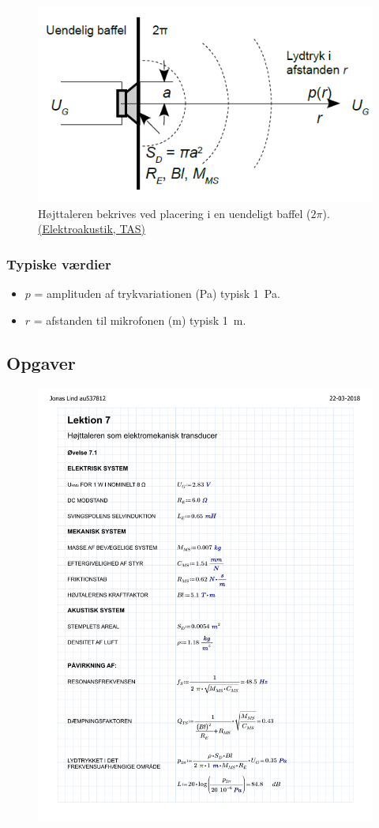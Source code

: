 \begin{figure} [H]
	\centering
	\includegraphics[width=0.7\linewidth]{graphics/29.png}
	\caption{Højttaleren bekrives ved placering i en uendeligt baffel ($2\pi$). \href{http://www.torean.dk/artikel/Elektroakustik.pdf}{(Elektroakustik, TAS)}}
	\label{fig:29}
\end{figure}

\subsubsection{Typiske værdier}
\begin{itemize}
	\item $p$ = amplituden af trykvariationen (\si{\pascal}) typisk \SI{1}{\pascal}.
	\item $r$ = afstanden til mikrofonen (\si{\meter}) typisk \SI{1}{\meter}.
\end{itemize}

\subsection{Opgaver}
\begin{figure} [H]
	\includegraphics[width=\linewidth]{graphics/L7.pdf}
\end{figure}